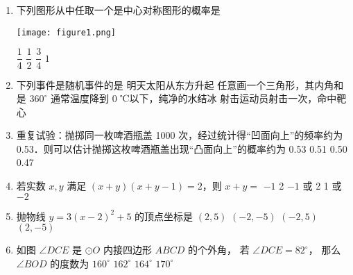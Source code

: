 \documentclass{ExamJHSMath}
\begin{document}
\chapter[八年级下学期期中试卷数学]{
  \hspace*{-0.3em}
}


\subsection{}
\begin{enumerate}[ref={\arabic*}]

\item 下列图形从中任取一个是中心对称图形的概率是 \choice{}
\begin{center}
\vspace{-2ex}
  \texttt{[image: figure1.png]}
\vspace{-2ex}
\end{center}
\options
  {$\dfrac{1}{4}$}
  {$\dfrac{1}{2}$}
  {$\dfrac{3}{4}$}
  {$1$}

\item 下列事件是随机事件的是 \choice{}
\options
  {明天太阳从东方升起}
  {任意画一个三角形，其内角和是 $360^\circ$}
  {通常温度降到 0 ℃以下，纯净的水结冰}
  {射击运动员射击一次，命中靶心}

\item 重复试验：抛掷同一枚啤酒瓶盖 1000 次，经过统计得“凹面向上”的频率约为 0.53．则可以估计抛掷这枚啤酒瓶盖出现“凸面向上”的概率约为 \choice{}
\options
  {0.53}
  {0.51}
  {0.50}
  {0.47}

\item 若实数 $x, y$ 满足 $(x+y)(x+y-1)=2$，则 $x+y=$ \choice{}
\options
  {$-1$}
  {2}
  {$-1$ 或 2}
  {1 或 $-2$}

\item 抛物线 $y=3(x-2)^{2}+5$ 的顶点坐标是 \choice{}
\options
  {$(2,5)$}
  {$(-2,-5)$}
  {$(-2,5)$}
  {$(2,-5)$}

\item 如图 $\angle DCE$ 是 $\odot O$ 内接四边形 $ABCD$ 的个外角， 若 $\angle DCE=82^\circ$， 那么 $\angle BOD$ 的度数为 \choice{}
\options
  {$160^\circ$}
  {$162^\circ$}
  {$164^\circ$}
  {$170^\circ$}


\end{enumerate}
\end{document}
